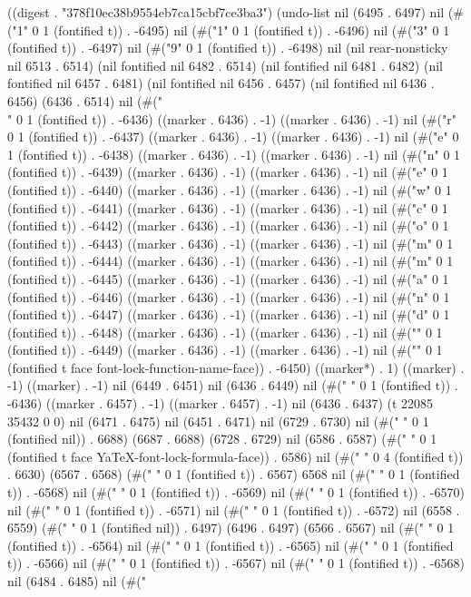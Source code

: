 
((digest . "378f10ec38b9554eb7ca15cbf7ce3ba3") (undo-list nil (6495 . 6497) nil (#("1" 0 1 (fontified t)) . -6495) nil (#("1" 0 1 (fontified t)) . -6496) nil (#("3" 0 1 (fontified t)) . -6497) nil (#("9" 0 1 (fontified t)) . -6498) nil (nil rear-nonsticky nil 6513 . 6514) (nil fontified nil 6482 . 6514) (nil fontified nil 6481 . 6482) (nil fontified nil 6457 . 6481) (nil fontified nil 6456 . 6457) (nil fontified nil 6436 . 6456) (6436 . 6514) nil (#("\\" 0 1 (fontified t)) . -6436) ((marker . 6436) . -1) ((marker . 6436) . -1) nil (#("r" 0 1 (fontified t)) . -6437) ((marker . 6436) . -1) ((marker . 6436) . -1) nil (#("e" 0 1 (fontified t)) . -6438) ((marker . 6436) . -1) ((marker . 6436) . -1) nil (#("n" 0 1 (fontified t)) . -6439) ((marker . 6436) . -1) ((marker . 6436) . -1) nil (#("e" 0 1 (fontified t)) . -6440) ((marker . 6436) . -1) ((marker . 6436) . -1) nil (#("w" 0 1 (fontified t)) . -6441) ((marker . 6436) . -1) ((marker . 6436) . -1) nil (#("c" 0 1 (fontified t)) . -6442) ((marker . 6436) . -1) ((marker . 6436) . -1) nil (#("o" 0 1 (fontified t)) . -6443) ((marker . 6436) . -1) ((marker . 6436) . -1) nil (#("m" 0 1 (fontified t)) . -6444) ((marker . 6436) . -1) ((marker . 6436) . -1) nil (#("m" 0 1 (fontified t)) . -6445) ((marker . 6436) . -1) ((marker . 6436) . -1) nil (#("a" 0 1 (fontified t)) . -6446) ((marker . 6436) . -1) ((marker . 6436) . -1) nil (#("n" 0 1 (fontified t)) . -6447) ((marker . 6436) . -1) ((marker . 6436) . -1) nil (#("d" 0 1 (fontified t)) . -6448) ((marker . 6436) . -1) ((marker . 6436) . -1) nil (#("{" 0 1 (fontified t)) . -6449) ((marker . 6436) . -1) ((marker . 6436) . -1) nil (#("}" 0 1 (fontified t face font-lock-function-name-face)) . -6450) ((marker*) . 1) ((marker) . -1) ((marker) . -1) nil (6449 . 6451) nil (6436 . 6449) nil (#("
" 0 1 (fontified t)) . -6436) ((marker . 6457) . -1) ((marker . 6457) . -1) nil (6436 . 6437) (t 22085 35432 0 0) nil (6471 . 6475) nil (6451 . 6471) nil (6729 . 6730) nil (#(" " 0 1 (fontified nil)) . 6688) (6687 . 6688) (6728 . 6729) nil (6586 . 6587) (#("	" 0 1 (fontified t face YaTeX-font-lock-formula-face)) . 6586) nil (#("	   " 0 4 (fontified t)) . 6630) (6567 . 6568) (#(" " 0 1 (fontified t)) . 6567) 6568 nil (#("
" 0 1 (fontified t)) . -6568) nil (#("	" 0 1 (fontified t)) . -6569) nil (#(" " 0 1 (fontified t)) . -6570) nil (#(" " 0 1 (fontified t)) . -6571) nil (#(" " 0 1 (fontified t)) . -6572) nil (6558 . 6559) (#(" " 0 1 (fontified nil)) . 6497) (6496 . 6497) (6566 . 6567) nil (#("
" 0 1 (fontified t)) . -6564) nil (#("	" 0 1 (fontified t)) . -6565) nil (#(" " 0 1 (fontified t)) . -6566) nil (#(" " 0 1 (fontified t)) . -6567) nil (#(" " 0 1 (fontified t)) . -6568) nil (6484 . 6485) nil (#("
